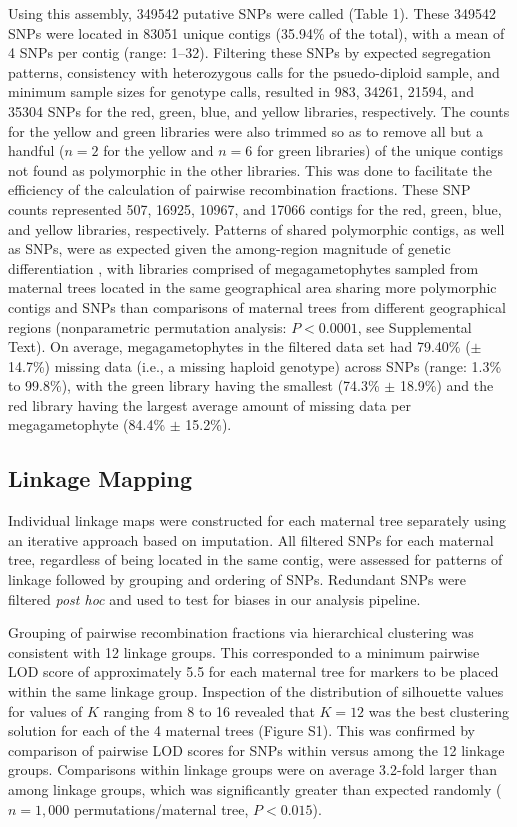 \documentclass[smallextended]{svjour3}
\begin{document}
Using this assembly, \num{349542} putative SNPs were called (Table 1). These
\num{349542} SNPs were located in \num{83051} unique contigs (35.94\% of the
total), with a mean of \num{4} SNPs per contig (range:
\SIrange{1}{32}{}). Filtering these SNPs by expected segregation patterns,
consistency with heterozygous calls for the psuedo-diploid sample, and minimum
sample sizes for genotype calls, resulted in \num{983}, \num{34261},
\num{21594}, and \num{35304} SNPs for the red, green, blue, and yellow
libraries, respectively. The counts for the yellow and green libraries were also
trimmed so as to remove all but a handful ($n = 2$ for the yellow and $n = 6$
for green libraries) of the unique contigs not found as polymorphic in the other
libraries. This was done to facilitate the efficiency of the calculation of
pairwise recombination fractions. These SNP counts represented \num{507},
\num{16925}, \num{10967}, and \num{17066} contigs for the red, green, blue, and
yellow libraries, respectively. Patterns of shared polymorphic contigs, as well
as SNPs, were as expected given the among-region magnitude of genetic
differentiation \citep[Figure 2, see][]{Eckert:2008}, with libraries comprised
of megagametophytes sampled from maternal trees located in the same geographical
area sharing more polymorphic contigs and SNPs than comparisons of maternal
trees from different geographical regions (nonparametric permutation analysis:
$P < 0.0001$, see Supplemental Text).  On average, megagametophytes in the
filtered data set had 79.40\% ($\pm$ 14.7\%) missing data (i.e., a missing
haploid genotype) across SNPs (range: 1.3\% to 99.8\%), with the green library
having the smallest (74.3\% $\pm$ 18.9\%) and the red library having the largest
average amount of missing data per megagametophyte (84.4\% $\pm$ 15.2\%).

\subsection*{Linkage Mapping}

Individual linkage maps were constructed for each maternal tree separately using
an iterative approach based on imputation. All filtered SNPs for each maternal
tree, regardless of being located in the same contig, were assessed for patterns
of linkage followed by grouping and ordering of SNPs. Redundant SNPs were
filtered \textit{post hoc} and used to test for biases in our analysis pipeline.

Grouping of pairwise recombination fractions via hierarchical clustering was
consistent with \num{12} linkage groups.  This corresponded to a minimum
pairwise LOD score of approximately 5.5 for each maternal tree for markers to be
placed within the same linkage group.  Inspection of the distribution of
silhouette values for values of $K$ ranging from \num{8} to \num{16} revealed
that $K = 12$ was the best clustering solution for each of the \num{4} maternal
trees (Figure S1). This was confirmed by comparison of pairwise LOD scores for
SNPs within versus among the \num{12} linkage groups. Comparisons within linkage
groups were on average 3.2-fold larger than among linkage groups, which was
significantly greater than expected randomly ($n = 1,000$ permutations/maternal
tree, $P < 0.015$).
\end{document}
